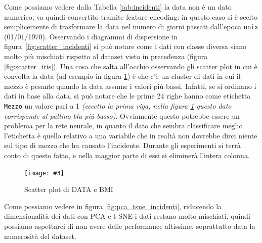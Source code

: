 \documentclass[12pt, twoside, letterpaper]{report}
\newcommand{\img}[4] {
	\begin{figure}
		\centering
		\texttt{[image: \#3]}\\
		\caption{#1}
		\label{fig:#4}
	\end{figure}
}
\begin{document}
			Come possiamo vedere dalla Tabella \ref{tab:incidenti} la data non è un dato numerico, va quindi convertito tramite feature encoding: in questo caso si è scelto semplicemente di trasformare la data nel numero di giorni passati dall'epoca \texttt{unix} (01/01/1970). Osservando i diagrammi di dispersione in figura~\ref{fig:scatter_incidenti} si può notare come i dati con classe diversa siano molto più mischiati rispetto al dataset visto in precedenza (figura \ref{fig:scatter_iris}). Una cosa che salta all'occhio osservando gli scatter plot in cui è convolta la data (ad esempio in figura \ref{fig:scatter_data}) è che c'è un cluster di dati in cui il mezzo è pesante quando la data assume i valori più bassi. Infatti, se si ordinano i dati in base alla data, si può notare che le prime 24 righe hanno come etichetta \texttt{Mezzo} un valore pari a 1 \textit{(eccetto la prima riga, nella figura \ref{fig:scatter_data} questo dato corrisponde al pallino blu più basso)}. Ovviamente questo potrebbe essere un problema per la rete neurale, in quanto il dato che sembra classificare meglio l'etichetta è quello relativo a una variabile che in realtà non dovrebbe dirci niente sul tipo di mezzo che ha causato l'incidente. Durante gli esperimenti si terrà conto di questo fatto, e nella maggior parte di essi si eliminerà l'intera colonna. 
			
			\img{Scatter plot di DATA e BMI}{0.4}{scatter_data.png}{scatter_data}
			
			Come possiamo vedere in figura \ref{fig:pca_tsne_incidenti}, riducendo la dimensionalità dei dati con PCA e t-SNE i dati restano molto mischiati, quindi possiamo aspettarci di non avere delle performance altissime, soprattutto data la numerosità del dataset.
			
\end{document}
